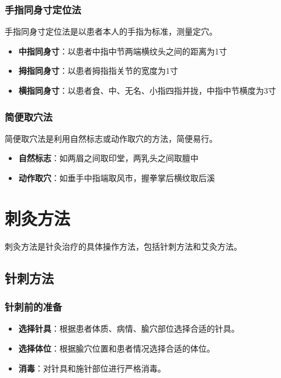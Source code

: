 \documentclass[12pt,UTF8]{ctexbook}
\begin{document}
\subsubsection{手指同身寸定位法}

手指同身寸定位法是以患者本人的手指为标准，测量定穴。

\begin{itemize}
\item \textbf{中指同身寸}：以患者中指中节两端横纹头之间的距离为1寸
\item \textbf{拇指同身寸}：以患者拇指指关节的宽度为1寸
\item \textbf{横指同身寸}：以患者食、中、无名、小指四指并拢，中指中节横度为3寸
\end{itemize}

\subsubsection{简便取穴法}

简便取穴法是利用自然标志或动作取穴的方法，简便易行。

\begin{itemize}
\item \textbf{自然标志}：如两眉之间取印堂，两乳头之间取膻中
\item \textbf{动作取穴}：如垂手中指端取风市，握拳掌后横纹取后溪
\end{itemize}

\section{刺灸方法}

刺灸方法是针灸治疗的具体操作方法，包括针刺方法和艾灸方法。

\subsection{针刺方法}

\subsubsection{针刺前的准备}

\begin{itemize}
\item \textbf{选择针具}：根据患者体质、病情、腧穴部位选择合适的针具。
\item \textbf{选择体位}：根据腧穴位置和患者情况选择合适的体位。
\item \textbf{消毒}：对针具和施针部位进行严格消毒。
\end{itemize}
\end{document}
